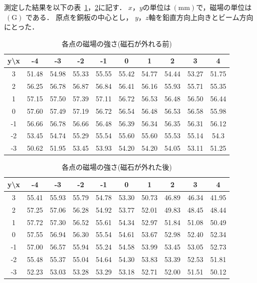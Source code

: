 測定した結果を以下の表~\ref{MF1}，\ref{MF2}に記す．
$x，y$の単位は$~(\mathrm{mm})$で，磁場の単位は$~(\mathrm{G})$ である．
原点を銅板の中心とし， $y，z$軸を鉛直方向上向きとビーム方向にとった．
\begin{table}[H]
  \begin{center}
    \caption{各点の磁場の強さ(磁石が外れる前)}\label{MF1}
    \begin{tabular}{|c||c|c|c|c|c|c|c|c|c|}\hline
       y\textbackslash x & -4 & -3 & -2 & -1 & 0 & 1 & 2 & 3 & 4 \\ \hline \hline
      3 & 51.48 & 54.98 & 55.33 & 55.55 & 55.42 & 54.77 & 54.44 & 53.27 & 51.75 \\ \hline
      2 & 56.25 & 56.78 & 56.87 & 56.84 & 56.41 & 56.16 & 55.93 & 55.71 & 55.35 \\ \hline
      1 & 57.15 & 57.50 & 57.39 & 57.11 & 56.72 & 56.53 & 56.48 & 56.50 & 56.44 \\ \hline
      0 & 57.60 & 57.49 & 57.19 & 56.72 & 56.54 & 56.48 & 56.53 & 56.58 & 55.98 \\ \hline
      -1 & 56.66 & 56.78 & 56.66 & 56.48 & 56.39 & 56.34 & 56.35 & 56.31 & 56.12 \\ \hline
      -2 & 53.45 & 54.74 & 55.29 & 55.54 & 55.60 & 55.60 & 55.53 & 55.14 & 54.3 \\ \hline
      -3 & 50.62 & 51.95 & 53.45 & 53.93 & 54.20 & 54.20 & 54.05 & 53.11 & 51.25 \\ \hline
    \end{tabular}
  \end{center}
\end{table}
\begin{table}[H]
  \begin{center}
    \caption{各点の磁場の強さ(磁石が外れた後)}\label{MF2}
    \begin{tabular}{|c||c|c|c|c|c|c|c|c|c|}\hline
       y\textbackslash x & -4 & -3 & -2 & -1 & 0 & 1 & 2 & 3 & 4 \\ \hline \hline
      3 & 55.41 & 55.93 & 55.79 & 54.78 & 53.30 & 50.73 & 46.89 & 46.34 & 41.95 \\ \hline
      2 & 57.25 & 57.06 & 56.28 & 54.92 & 53.77 & 52.01 & 49.83 & 48.45 & 48.44 \\ \hline
      1 & 57.72 & 57.30 & 56.52 & 55.61 & 54.34 & 52.97 & 51.84 & 51.08 & 50.49 \\ \hline
      0 & 57.55 & 56.94 & 56.30 & 55.54 & 54.61 & 53.67 & 52.98 & 52.40 & 52.34 \\ \hline
      -1 & 57.00 & 56.57 & 55.94 & 55.24 & 54.58 & 53.99 & 53.45 & 53.05 & 52.73 \\ \hline
      -2 & 55.48 & 55.37 & 55.04 & 54.64 & 54.30 & 53.83 & 53.39 & 52.53 & 51.81 \\ \hline
      -3 & 52.23 & 53.03 & 53.28 & 53.29 & 53.18 & 52.71 & 52.00 & 51.51 & 50.12 \\ \hline
 \end{tabular}
  \end{center}
\end{table}

